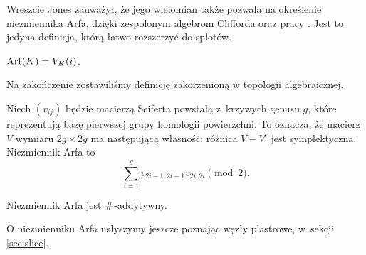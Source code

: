 Wreszcie Jones zauważył, że jego wielomian także pozwala na określenie niezmiennika Arfa, dzięki zespolonym algebrom Clifforda oraz pracy \cite{lannes85}.
Jest to jedyna definicja, którą łatwo rozszerzyć do splotów.

\begin{proposition}[Jones, 1985]
    $\operatorname{Arf}(K) = V_K(i)$.
\end{proposition}

Na zakończenie zostawiliśmy definicję zakorzenioną w topologii algebraicznej.

\begin{proposition}
    Niech $(v_{ij})$ będzie macierzą Seiferta powstałą z~krzywych genusu $g$, które reprezentują bazę pierwszej grupy homologii powierzchni.
    To oznacza, że macierz $V$ wymiaru $2g \times 2g$ ma następującą własność: różnica $V - V^t$ jest symplektyczna.
    Niezmiennik Arfa to
    \begin{equation}
        \sum^g_{i=1}v_{2i-1,2i-1}v_{2i,2i} \pmod 2.
    \end{equation}
\end{proposition}

\begin{proposition}
    Niezmiennik Arfa jest $\mathbin{\#}$-addytywny.
\end{proposition}

O niezmienniku Arfa usłyszymy jeszcze poznając węzły plastrowe, w~sekcji \ref{sec:slice}.

